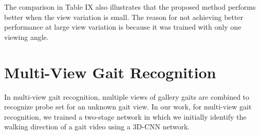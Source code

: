 The comparison in Table IX also illustrates that the proposed method performs better when the view variation is small. The reason for not achieving better performance at large view variation is because it was trained with only one viewing angle.  







\section{Multi-View Gait Recognition}
In multi-view gait recognition, multiple views of gallery gaits are combined to recognize probe set for an unknown gait view. In our work, for multi-view gait recognition, we trained a two-stage network in which we initially identify the walking direction of a gait video using a 3D-CNN network. 

